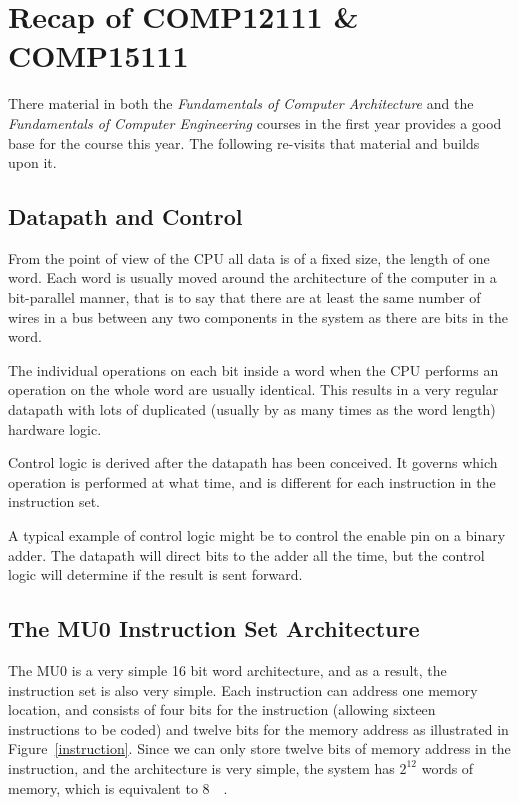 

\section{Recap of COMP12111 \& COMP15111}

There material in both the {\it Fundamentals of Computer Architecture} and the
{\it Fundamentals of Computer Engineering} courses in the first year provides a
good base for the course this year. The following re-visits that material and
builds upon it.

\subsection{Datapath and Control}

From the point of view of the CPU all data is of a fixed size, the length of one
word. Each word is usually moved around the architecture of the computer in a
bit-parallel manner, that is to say that there are at least the same number of
wires in a bus between any two components in the system as there are bits in the
word.

The individual operations on each bit inside a word when the CPU performs an
operation on the whole word are usually identical. This results in a very
regular datapath with lots of duplicated (usually by as many times as the word
length) hardware logic.

Control logic is derived after the datapath has been conceived. It governs which
operation is performed at what time, and is different for each instruction in
the instruction set.

A typical example of control logic might be to control the enable pin on a
binary adder. The datapath will direct bits to the adder all the time, but the
control logic will determine if the result is sent forward.

\subsection{The MU0 Instruction Set Architecture}

The MU0 is a very simple 16 bit word architecture, and as a result, the
instruction set is also very simple. Each instruction can address one memory
location, and consists of four bits for the instruction (allowing sixteen
instructions to be coded) and twelve bits for the memory address as illustrated
in Figure~\ref{instruction}. Since we can only store twelve bits of memory
address in the instruction, and the architecture is very simple, the system has
$2^{12}$ words of memory, which is equivalent to \SI{8}{\kilo\byte}.

